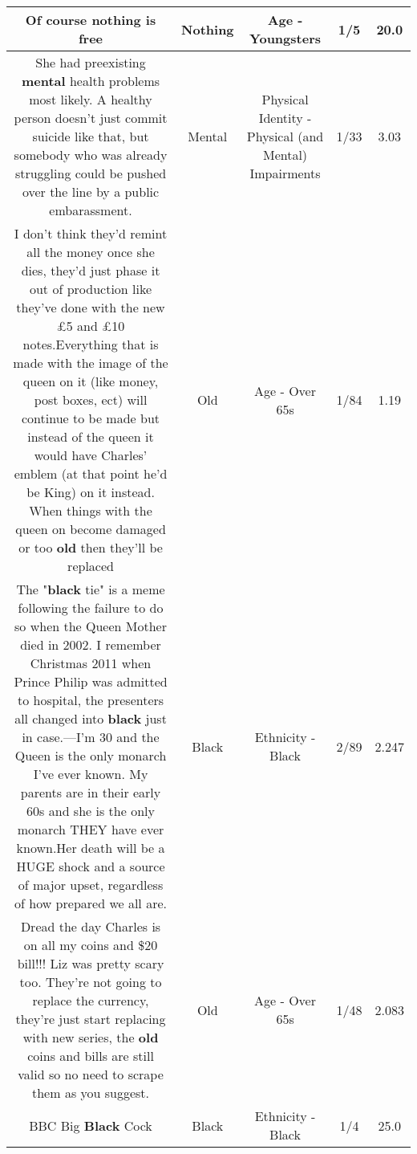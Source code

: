 \documentclass[11pt]{article}
\newlength\mylength
\begin{document}
\begin{center}
\begin{longtable}{|C{.65\mylength}|C{.30\mylength}|C{.12\mylength}|C{.12\mylength}|C{.12\mylength}|}
  \small Of course \textbf{nothing} is free\normalsize   & Nothing & Age - Youngsters & 1/5 & 20.0 \\  \hline
  \small She had preexisting \textbf{mental} health problems most likely. A healthy person doesn't just commit suicide like that, but somebody who was already struggling could be pushed over the line by a public embarassment.\normalsize   & Mental & Physical Identity - Physical (and Mental) Impairments & 1/33 & 3.03 \\  \hline
  \small I don't think they'd remint all the money once she dies, they'd just phase it out of production like they've done with the new £5 and £10 notes.Everything that is made with the image of the queen on it (like money, post boxes, ect) will continue to be made but instead of the queen it would have Charles' emblem (at that point he'd be King) on it instead. When things with the queen on become damaged or too \textbf{old} then they'll be replaced\normalsize   & Old & Age - Over 65s & 1/84 & 1.19 \\  \hline
  \small The "\textbf{black} tie" is a meme following the failure to do so when the Queen Mother died in 2002.  I remember Christmas 2011 when Prince Philip was admitted to hospital, the presenters all changed into \textbf{black} just in case.---I'm 30 and the Queen is the only monarch I've ever known.  My parents are in their early 60s and she is the only monarch THEY have ever known.Her death will be a HUGE shock and a source of major upset, regardless of how prepared we all are.\normalsize   & Black & Ethnicity - Black & 2/89 & 2.247 \\  \hline
  \small Dread the day Charles is on all my coins and \$20 bill!!!  Liz was pretty scary too.  They're not going to replace the currency, they're just start replacing with new series, the \textbf{old} coins and bills are still valid so no need to scrape them as you suggest.\normalsize   & Old & Age - Over 65s & 1/48 & 2.083 \\  \hline
  \small BBC Big \textbf{Black} Cock\normalsize   & Black & Ethnicity - Black & 1/4 & 25.0 \\  \hline

\end{longtable}
\end{center}
\end{document}
